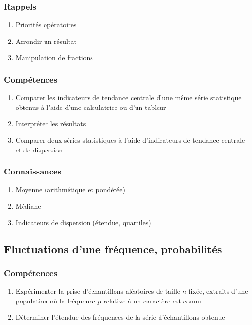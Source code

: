 \documentclass[12pt,a4paper]{article}
\begin{document}

\subsubsection*{Rappels}
	\begin{enumerate}
		\item Priorités opératoires
		\item Arrondir un résultat
		\item Manipulation de fractions
	\end{enumerate}
\subsubsection*{Compétences}
	\begin{enumerate}
		\item Comparer les indicateurs de tendance centrale d'une même série statistique obtenus à l'aide d'une calculatrice ou d'un tableur
		\item Interpréter les résultats
		\item Comparer deux séries statistiques à l'aide d'indicateurs de tendance centrale et de dispersion
	\end{enumerate}

\subsubsection*{Connaissances}
	\begin{enumerate}
		\item Moyenne (arithmétique et pondérée)
		\item Médiane
		\item Indicateurs de dispersion (étendue, quartiles)
	\end{enumerate}

\subsection{Fluctuations d'une fréquence, probabilités}

\subsubsection*{Compétences}
\begin{enumerate}
	\item Expérimenter la prise d'échantillons aléatoires de taille $n$ fixée, extraits d'une population où la fréquence $p$ relative à un caractère est connu
	\item Déterminer l'étendue des fréquences de la série d'échantillons obtenue
\end{enumerate}
\end{document}
